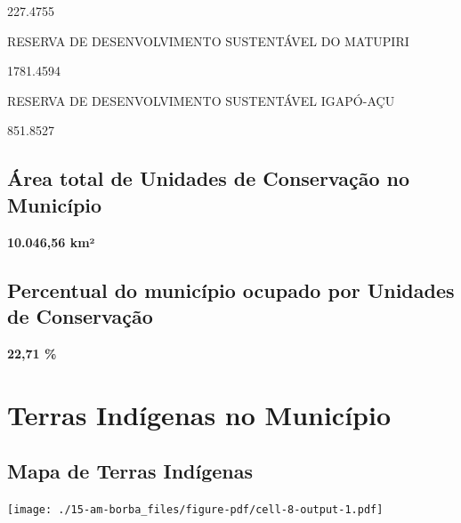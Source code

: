 \documentclass[
  letterpaper,
]{report}
\begin{document}
227.4755

\n    

\n    

\n      

RESERVA DE DESENVOLVIMENTO SUSTENTÁVEL DO MATUPIRI

\n      

1781.4594

\n    

\n    

\n      

RESERVA DE DESENVOLVIMENTO SUSTENTÁVEL IGAPÓ-AÇU

\n      

851.8527

\n    

\n  

\n

\hypertarget{uxe1rea-total-de-unidades-de-conservauxe7uxe3o-no-municuxedpio-1}{%
\subsection{Área total de Unidades de Conservação no
Município}\label{uxe1rea-total-de-unidades-de-conservauxe7uxe3o-no-municuxedpio-1}}

\textbf{10.046,56 km²}

\hypertarget{percentual-do-municuxedpio-ocupado-por-unidades-de-conservauxe7uxe3o-1}{%
\subsection{Percentual do município ocupado por Unidades de
Conservação}\label{percentual-do-municuxedpio-ocupado-por-unidades-de-conservauxe7uxe3o-1}}

\textbf{22,71 \%}

\hypertarget{terras-induxedgenas-no-municuxedpio-1}{%
\section{Terras Indígenas no
Município}\label{terras-induxedgenas-no-municuxedpio-1}}

\hypertarget{mapa-de-terras-induxedgenas-1}{%
\subsection{Mapa de Terras
Indígenas}\label{mapa-de-terras-induxedgenas-1}}

\texttt{[image: ./15-am-borba\_files/figure-pdf/cell-8-output-1.pdf]}
\end{document}
